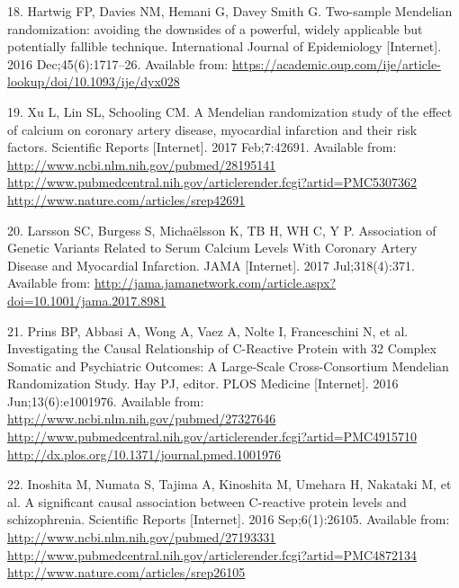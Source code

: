 \documentclass[]{article}
\begin{document}
\hypertarget{ref-Hartwig2016}{}
18. Hartwig FP, Davies NM, Hemani G, Davey Smith G. Two-sample Mendelian
randomization: avoiding the downsides of a powerful, widely applicable
but potentially fallible technique. International Journal of
Epidemiology {[}Internet{]}. 2016 Dec;45(6):1717--26. Available from:
\url{https://academic.oup.com/ije/article-lookup/doi/10.1093/ije/dyx028}

\hypertarget{ref-Xu2017}{}
19. Xu L, Lin SL, Schooling CM. A Mendelian randomization study of the
effect of calcium on coronary artery disease, myocardial infarction and
their risk factors. Scientific Reports {[}Internet{]}. 2017 Feb;7:42691.
Available from:
\href{http://www.ncbi.nlm.nih.gov/pubmed/28195141\%20http://www.pubmedcentral.nih.gov/articlerender.fcgi?artid=PMC5307362\%20http://www.nature.com/articles/srep42691}{http://www.ncbi.nlm.nih.gov/pubmed/28195141 http://www.pubmedcentral.nih.gov/articlerender.fcgi?artid=PMC5307362 http://www.nature.com/articles/srep42691}

\hypertarget{ref-Larsson2017}{}
20. Larsson SC, Burgess S, Michaëlsson K, TB H, WH C, Y P. Association
of Genetic Variants Related to Serum Calcium Levels With Coronary Artery
Disease and Myocardial Infarction. JAMA {[}Internet{]}. 2017
Jul;318(4):371. Available from:
\url{http://jama.jamanetwork.com/article.aspx?doi=10.1001/jama.2017.8981}

\hypertarget{ref-Prins2016}{}
21. Prins BP, Abbasi A, Wong A, Vaez A, Nolte I, Franceschini N, et al.
Investigating the Causal Relationship of C-Reactive Protein with 32
Complex Somatic and Psychiatric Outcomes: A Large-Scale Cross-Consortium
Mendelian Randomization Study. Hay PJ, editor. PLOS Medicine
{[}Internet{]}. 2016 Jun;13(6):e1001976. Available from:
\href{http://www.ncbi.nlm.nih.gov/pubmed/27327646\%20http://www.pubmedcentral.nih.gov/articlerender.fcgi?artid=PMC4915710\%20http://dx.plos.org/10.1371/journal.pmed.1001976}{http://www.ncbi.nlm.nih.gov/pubmed/27327646 http://www.pubmedcentral.nih.gov/articlerender.fcgi?artid=PMC4915710 http://dx.plos.org/10.1371/journal.pmed.1001976}

\hypertarget{ref-Inoshita2016}{}
22. Inoshita M, Numata S, Tajima A, Kinoshita M, Umehara H, Nakataki M,
et al. A significant causal association between C-reactive protein
levels and schizophrenia. Scientific Reports {[}Internet{]}. 2016
Sep;6(1):26105. Available from:
\href{http://www.ncbi.nlm.nih.gov/pubmed/27193331\%20http://www.pubmedcentral.nih.gov/articlerender.fcgi?artid=PMC4872134\%20http://www.nature.com/articles/srep26105}{http://www.ncbi.nlm.nih.gov/pubmed/27193331 http://www.pubmedcentral.nih.gov/articlerender.fcgi?artid=PMC4872134 http://www.nature.com/articles/srep26105}
\end{document}

